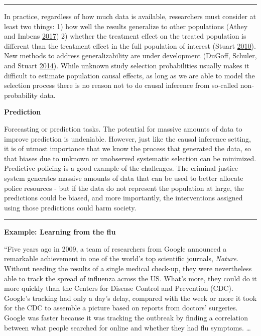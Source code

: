 \documentclass[]{krantz}
\begin{document}
\begin{center}\rule{0.5\linewidth}{\linethickness}\end{center}

In practice, regardless of how much data is available, researchers must
consider at least two things: 1) how well the results generalize to
other populations (Athey and Imbens
\protect\hyperlink{ref-athey2017state}{2017}) 2) whether the treatment
effect on the treated population is different than the treatment effect
in the full population of interest (Stuart
\protect\hyperlink{ref-stuart2010matching}{2010}). New methods to
address generalizability are under development (DuGoff, Schuler, and
Stuart \protect\hyperlink{ref-dugoff2014generalizing}{2014}). While
unknown study selection probabilities usually makes it difficult to
estimate population causal effects, as long as we are able to model the
selection process there is no reason not to do causal inference from
so-called non-probability data.

\textbf{Prediction}

Forecasting or prediction tasks. The potential for massive amounts of
data to improve prediction is undeniable. However, just like the causal
inference setting, it is of utmost importance that we know the process
that generated the data, so that biases due to unknown or unobserved
systematic selection can be minimized. Predictive policing is a good
example of the challenges. The criminal justice system generates massive
amounts of data that can be used to better allocate police resources -
but if the data do not represent the population at large, the
predictions could be biased, and more importantly, the interventions
assigned using those predictions could harm society.

\begin{center}\rule{0.5\linewidth}{\linethickness}\end{center}

\textbf{Example: Learning from the flu}

``Five years ago in 2009, a team of researchers from Google announced a
remarkable achievement in one of the world's top scientific journals,
\emph{Nature}. Without needing the results of a single medical check-up,
they were nevertheless able to track the spread of influenza across the
US. What's more, they could do it more quickly than the Centers for
Disease Control and Prevention (CDC). Google's tracking had only a day's
delay, compared with the week or more it took for the CDC to assemble a
picture based on reports from doctors' surgeries. Google was faster
because it was tracking the outbreak by finding a correlation between
what people searched for online and whether they had flu symptoms.
\ldots{}
\end{document}
